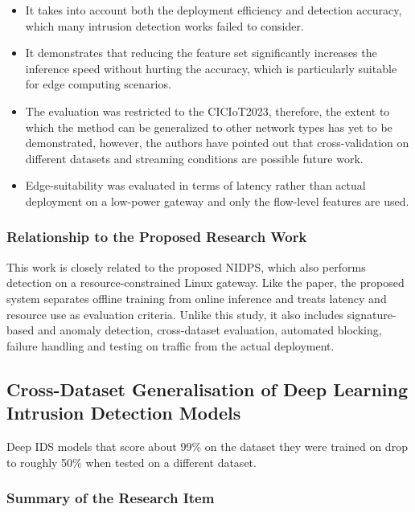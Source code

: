 \begin{itemize}
\item It takes into account both the deployment efficiency and detection accuracy, which many intrusion detection works failed to consider.
\item It demonstrates that reducing the feature set significantly increases the inference speed without hurting the accuracy, which is particularly suitable for edge computing scenarios.
\item The evaluation was restricted to the CICIoT2023, therefore, the extent to which the method can be generalized to other network types has yet to be demonstrated, however, the authors have pointed out that cross-validation on different datasets and streaming conditions are possible future work.
\item Edge-suitability was evaluated in terms of latency rather than actual deployment on a low-power gateway and only the flow-level features are used.
\end{itemize}

\subsubsection{Relationship to the Proposed Research Work}\label{sec:3.2.14.3}

\noindent This work is closely related to the proposed NIDPS, which also performs detection on a resource-constrained Linux gateway. Like the paper, the proposed system separates offline training from online inference and treats latency and resource use as evaluation criteria. Unlike this study, it also includes signature-based and anomaly detection, cross-dataset evaluation, automated blocking, failure handling and testing on traffic from the actual deployment.

\subsection{Cross-Dataset Generalisation of Deep Learning Intrusion Detection Models}\label{sec:3.2.15}

\noindent Deep IDS models that score about 99\% on the dataset they were trained on drop to roughly 50\% when tested on a different dataset.

\subsubsection{Summary of the Research Item}\label{sec:3.2.15.1}

